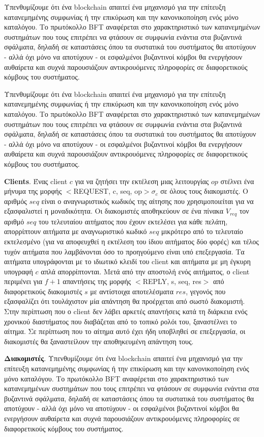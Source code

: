 Υπενθυμίζουμε ότι ένα blockchain απαιτεί ένα μηχανισμό για την επίτευξη κατανεμημένης συμφωνίας ή την επικύρωση και την κανονικοποίηση ενός μόνο καταλόγου. Το πρωτόκολλο BFT αναφέρεται στο χαρακτηριστικό των κατανεμημένων συστημάτων που τους επιτρέπει να φτάσουν σε συμφωνία ενάντια στα βυζαντινά σφάλματα, δηλαδή σε καταστάσεις όπου τα συστατικά του συστήματος θα αποτύχουν - αλλά όχι μόνο να αποτύχουν - οι εσφαλμένοι βυζαντινοί κόμβοι θα ενεργήσουν αυθαίρετα και συχνά παρουσιάζουν αντικρουόμενες πληροφορίες σε διαφορετικούς κόμβους του συστήματος.

Υπενθυμίζουμε ότι ένα blockchain απαιτεί ένα μηχανισμό για την επίτευξη κατανεμημένης συμφωνίας ή την επικύρωση και την κανονικοποίηση ενός μόνο καταλόγου. Το πρωτόκολλο BFT αναφέρεται στο χαρακτηριστικό των κατανεμημένων συστημάτων που τους επιτρέπει να φτάσουν σε συμφωνία ενάντια στα βυζαντινά σφάλματα, δηλαδή σε καταστάσεις όπου τα συστατικά του συστήματος θα αποτύχουν - αλλά όχι μόνο να αποτύχουν - οι εσφαλμένοι βυζαντινοί κόμβοι θα ενεργήσουν αυθαίρετα και συχνά παρουσιάζουν αντικρουόμενες πληροφορίες σε διαφορετικούς κόμβους του συστήματος.


\textbf{Clients}. Ένας client $c$ για να ζητήσει την εκτέλεση μιας λειτουργίας $op$ στέλνει ένα μήνυμα της μορφής $<$REQUEST, c, seq, op$>\sigma_{c}$ σε όλους τους διακομιστές. Ο αριθμός $seq$ είναι ο αναγνωριστικός κωδικός της αίτησης που χρησιμοποιείται για να εξασφαλιστεί η μοναδικότητα. Οι διακομιστές αποθηκεύουν σε ένα πίνακα $V_{req}$ τον αριθμό $seq$ του τελευταίου αιτήματος που έχουν εκτελέσει για κάθε πελάτη, απορρίπτουν αιτήματα με αναγνωριστικό κωδικό $seq$ μικρότερο από το τελευταίο εκτελεσμένο (για να αποφευχθεί η εκτέλεση του ίδιου αιτήματος δύο φορές) και τέλος τυχόν αιτήματα που λαμβάνονται όσο το προηγούμενο είναι υπό επεξεργασία. Τα αιτήματα υπογράφονται με το ιδιωτικό κλειδί του client και αιτήματα με μη έγκυρη υπογραφή $c$ απλά απορρίπτονται. Μετά από την αποστολή ενός αιτήματος, ο client περιμένει για $f + 1$ απαντήσεις της μορφής $<$REPLY, s, seq, res$>$ από διαφορετικούς διακομιστές $s$ με αντίστοιχα αποτελέσματα $res$, γεγονός που εξασφαλίζει ότι τουλάχιστον μία απάντηση θα προέρχεται από σωστό διακομιστή. Στην περίπτωση που ο client δεν λάβει αρκετές απαντήσεις κατά τη διάρκεια ενός χρονικού διαστήματος που διαβάζεται από το τοπικό ρολόι του, ξαναστέλνει το αίτημα. Σε περίπτωση που το αίτημα αυτό έχει ήδη υποβληθεί σε επεξεργασία, οι διακομιστές θα ξαναστείλουν την αποθηκευμένη απάντηση τους.

\textbf{Διακομιστές}. Υπενθυμίζουμε ότι ένα blockchain απαιτεί ένα μηχανισμό για την επίτευξη κατανεμημένης συμφωνίας ή την επικύρωση και την κανονικοποίηση ενός μόνο καταλόγου. Το πρωτόκολλο BFT αναφέρεται στο χαρακτηριστικό των κατανεμημένων συστημάτων που τους επιτρέπει να φτάσουν σε συμφωνία ενάντια στα βυζαντινά σφάλματα, δηλαδή σε καταστάσεις όπου τα συστατικά του συστήματος θα αποτύχουν - αλλά όχι μόνο να αποτύχουν - οι εσφαλμένοι βυζαντινοί κόμβοι θα ενεργήσουν αυθαίρετα και συχνά παρουσιάζουν αντικρουόμενες πληροφορίες σε διαφορετικούς κόμβους του συστήματος.

